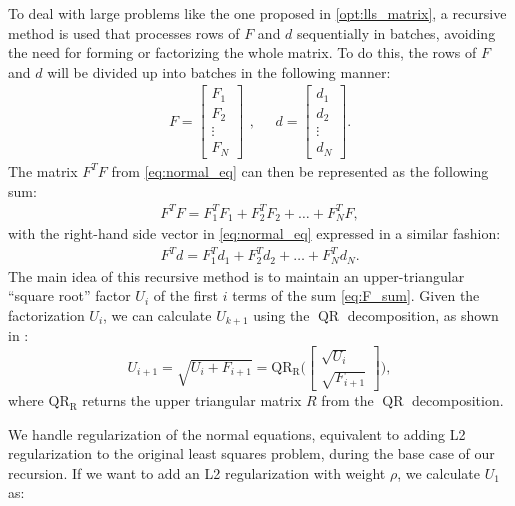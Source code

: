 \documentclass{article}
\begin{document}
To deal with large problems like the one proposed in \eqref{opt:lls_matrix}, a recursive
method is used that processes rows of $F$ and $d$ sequentially in batches, avoiding the need
for forming or factorizing the whole matrix. To do this, the rows of $F$ and $d$ will be
divided up into batches in the following manner:
\begin{equation}
    \begin{aligned}
        F = \begin{bmatrix} F_1 \\ F_2 \\ \vdots \\ F_N \end{bmatrix}
    \end{aligned},
    \quad 
    \begin{aligned}
        d = \begin{bmatrix} d_1 \\ d_2 \\ \vdots \\ d_N \end{bmatrix}.
    \end{aligned}
\end{equation}
The matrix $F^TF$ from \eqref{eq:normal_eq} can then be represented as the following sum:
\begin{align} \label{eq:F_sum}
    F^TF = F_1^TF_1 + F_2^TF_2 + \ldots + F_N^TF,
\end{align}
with the right-hand side vector in \eqref{eq:normal_eq} expressed in a similar fashion:
\begin{align}
    F^Td = F_1^Td_1 + F_2^Td_2 + \ldots + F_N^Td_N.
\end{align}
The main idea of this recursive method is to maintain an upper-triangular ``square root''
factor $U_i$ of the first $i$ terms of the sum \eqref{eq:F_sum}. Given the factorization 
$U_i$, we can calculate $U_{k+1}$ using the $\operatorname{QR}$ decomposition, as shown in
\cite{Howell2019}:
\begin{equation}
    U_{i+1} = \sqrt{U_i + F_{i+1}} = 
    \operatorname{QR_R}\bigg( \begin{bmatrix} \sqrt{U_i} \\ \sqrt{F_{i+1}} \end{bmatrix} \bigg),
\end{equation}
where $\operatorname{QR_R}$ returns the upper triangular matrix $R$ from the 
$\operatorname{QR}$ decomposition. 

We handle regularization of the normal equations, equivalent to adding L2 regularization to 
the original least squares problem, during the base case of our recursion. If we want to 
add an L2 regularization with weight $\rho$, we calculate $U_1$ as:
\end{document}
